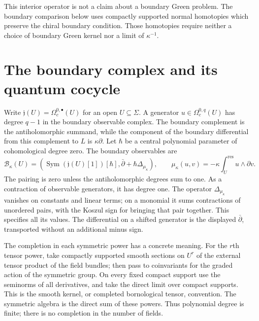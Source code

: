 This interior operator is not a claim about a boundary Green problem.
The boundary comparison below uses compactly supported normal
homotopies which preserve the chiral boundary condition.  Those
homotopies require neither a choice of boundary Green kernel nor a
limit of $\kappa^{-1}$.

\section{The boundary complex and its quantum cocycle}

Write $\mathfrak j(U)=\Omega_c^{0,\bullet}(U)$ for an open
$U\subseteq\Sigma$.  A generator $u\in\Omega_c^{0,q}(U)$ has degree
$q-1$ in the boundary observable complex.  The boundary complement
is the antiholomorphic summand, while the component of the boundary
differential from this complement to $L$ is $\kappa\partial$.
Let $\hbar$ be a central polynomial parameter of cohomological degree
zero.  The boundary observables are
\[
 \mathcal B_\kappa(U)=
 \left(\operatorname{Sym}(\mathfrak j(U)[1])[\hbar],
             \bar\partial+\hbar\Delta_{\mu_\kappa}\right),
 \qquad
 \mu_\kappa(u,v)=-\kappa\int_U^{\mathrm{res}}u\wedge\partial v.
\]
The pairing is zero unless the antiholomorphic degrees sum to one.
As a contraction of observable generators, it has degree one.
The operator $\Delta_{\mu_\kappa}$ vanishes on constants and linear
terms; on a monomial it sums contractions of unordered pairs, with
the Koszul sign for bringing that pair together.  This specifies all
its values.  The differential on a shifted generator is the displayed
$\bar\partial$, transported without an additional minus sign.

The completion in each symmetric power has a concrete meaning.
For the $r$th tensor power, take compactly supported smooth sections
on $U^r$ of the external tensor product of the field bundles; then
pass to coinvariants for the graded action of the symmetric group.
On every fixed compact support use the seminorms of all derivatives,
and take the direct limit over compact supports.  This is the smooth
kernel, or completed bornological tensor, convention.  The symmetric
algebra is the direct sum of these powers.  Thus polynomial degree
is finite; there is no completion in the number of fields.

